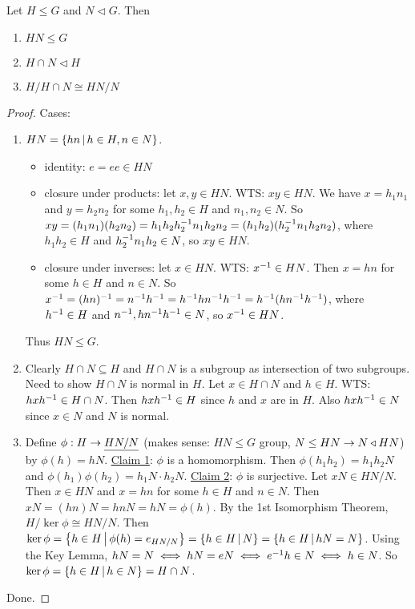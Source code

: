 \documentclass[]{article}
\begin{document}
\begin{theorem}
	Let $H\leq G$ and $N\triangleleft G$. Then
	\begin{enumerate}
		\item $HN\leq G$
		\item $H\cap N\triangleleft H$
		\item $H/H\cap N\cong HN/N$
	\end{enumerate}
\end{theorem}
\begin{proof}
	Cases:
	\begin{enumerate}
		\item $HN = \left\{ hn \, \middle| \, h\in H,n\in N \right\}$.
			\begin{itemize}
				\item identity: $e=ee\in HN$
				\item closure under products:
					let $x,y\in HN$. WTS: $xy\in HN$. We have $x=h_1n_1$ and $y=h_2n_2$ for some $h_1,h_2\in H$ and $n_1,n_2\in N$.
					So $xy=(h_1n_1)(h_2n_2) = h_1h_2h_2^{-1} n_1h_2n_2 = (h_1h_2)(h_2^{-1} n_1h_2n_2)$, where $h_1h_2\in H$ and $h_2^{-1} n_1h_2\in N$, so $xy\in HN$.
				\item closure under inverses:
					let $x\in HN$. WTS: $x^{-1}\in HN$. Then $x=hn$ for some $h\in H$ and $n\in N$. So $x^{-1} = (hn)^{-1} = n^{-1} h^{-1} = h^{-1} hn^{-1} h^{-1} = h^{-1}(hn^{-1} h^{-1})$, where $h^{-1}\in H$ and $n^{-1},hn^{-1} h^{-1}\in N$, so $x^{-1}\in HN$.
			\end{itemize}
			Thus $HN\leq G$.
		\item Clearly $H\cap N\subseteq H$ and $H\cap N$ is a subgroup as intersection of two subgroups.
			Need to show $H\cap N$ is normal in $H$.
			Let $x\in H\cap N$ and $h\in H$. WTS: $hxh^{-1}\in H\cap N$.
			Then $hxh^{-1}\in H$ since $h$ and $x$ are in $H$.
			Also $hxh^{-1}\in N$ since $x\in N$ and $N$ is normal.
		\item Define $\phi:H\rightarrow \underline{HN/N}$ (makes sense: $HN\leq G$ group, $N\leq HN \rightarrow N\triangleleft HN$) by $\phi(h)=hN$.
			\ul{Claim 1}: $\phi$ is a homomorphism.
			Then $\phi(h_1h_2) = h_1h_2N$ and $\phi(h_1)\phi(h_2) = h_1N\cdot h_2N$.
			\ul{Claim 2}: $\phi$ is surjective.
			Let $xN\in HN/N$. Then $x\in HN$ and $x=hn$ for some $h\in H$ and $n\in N$.
			Then $xN = (hn)N = hnN = hN = \phi(h)$.
			By the 1st Isomorphism Theorem, $H/\ker\phi\cong HN/N$.
			Then $\ker\phi = \left\{ h\in H \, \middle| \, \phi(h) = e_{HN/N} \right\} = \left\{ h\in H \, \middle| \, N \right\} = \left\{ h\in H \, \middle| \, hN=N \right\}$.
			Using the Key Lemma, $hN=N \iff hN=eN \iff e^{-1} h\in N \iff h\in N$.
			So $\ker\phi = \left\{ h\in H \, \middle| \, h\in N \right\} = H\cap N$.
	\end{enumerate}
	Done.
\end{proof}
\end{document}
